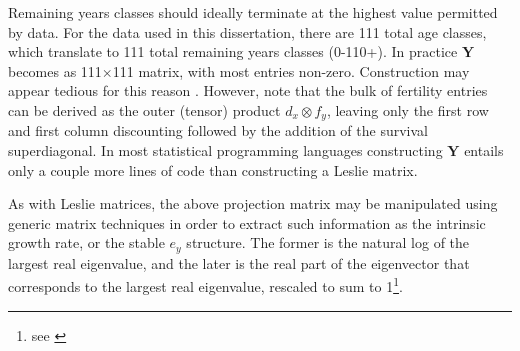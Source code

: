 Remaining years classes should ideally terminate at the highest value permitted
by data. For the data used in this dissertation, there are 111 total age
classes, which translate to 111 total remaining years classes (0-110+). In practice 
$\textbf{Y}$ becomes
as 111$\times$111 matrix, with most entries non-zero. Construction may appear
tedious for this reason . However, note that the bulk of fertility entries can
be derived as the outer (tensor) product $d_x \otimes f_y$, leaving only the 
first row and first column discounting followed by the addition of the survival
superdiagonal. In most statistical programming languages constructing $\textbf{Y}$ entails only
a couple more lines of code than constructing a Leslie matrix.

As with Leslie matrices, the above projection matrix may be manipulated using
generic matrix techniques in order to extract such information as the intrinsic
growth rate, or the stable $e_y$ structure. The former is the natural log of the
largest real eigenvalue, and the later is the real part of the eigenvector that
corresponds to the largest real eigenvalue, rescaled to sum to 1\footnote{see
\citet[pp 86-87]{caswell2001matrix}}.

 \FloatBarrier